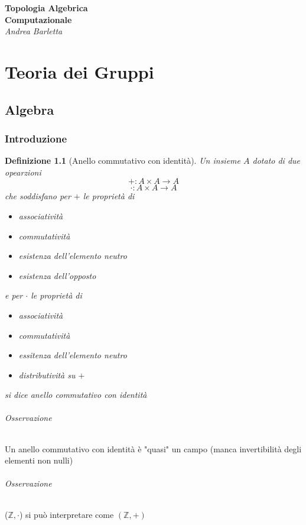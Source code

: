 \documentclass[a4paper]{report}
\newtheorem{definition}{Definizione}
\begin{document}
\begin{titlepage}
    \begin{center}
        \Large\textbf{Topologia Algebrica\\Computazionale}\\
        \large\textit{Andrea Barletta}
    \end{center}
\end{titlepage}
\tableofcontents
\part{Teoria dei Gruppi}
\chapter{Algebra}
\section{Introduzione}
\begin{definition}[Anello commutativo con identità]
    Un insieme $A$ dotato di due opearzioni
    \[
        +:A\times A\rightarrow A
    \]
    \[
        \cdot:A\times A\rightarrow A
    \]
    che soddisfano per $+$ le proprietà di
    \begin{itemize}
        \item associatività
        \item commutatività
        \item esistenza dell'elemento neutro
        \item esistenza dell'opposto
    \end{itemize}
    e per $\cdot$ le proprietà di
    \begin{itemize}
        \item associatività
        \item commutatività
        \item essitenza dell'elemento neutro
        \item distributività su $+$
    \end{itemize}
    si dice anello commutativo con identità
\end{definition}
\paragraph{Osservazione}Un anello commutativo con identità è "quasi" un campo (manca invertibilità degli elementi non nulli)
\paragraph{Osservazione}($\mathbb{Z},\cdot$) si può interpretare come $(\mathbb{Z},+)$
\end{document}

